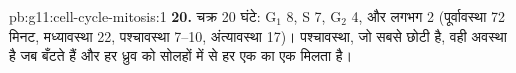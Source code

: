 \begin{solution}{pb:g11:cell-cycle-mitosis:1}
\textbf{20.} चक्र 20 घंटे: $\mathrm{G_1}$ 8, S 7, $\mathrm{G_2}$ 4, और
 लगभग 2 (पूर्वावस्था 72 मिनट, मध्यावस्था 22, पश्चावस्था
7--10, अंत्यावस्था 17)। पश्चावस्था, जो सबसे छोटी है, वही अवस्था है जब
 बँटते हैं और हर ध्रुव को सोलहों  में से हर एक का एक
 मिलता है।
\end{solution}
